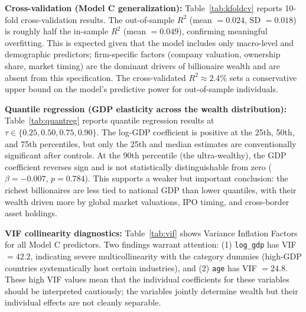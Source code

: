 \documentclass[a4paper,10pt]{article}
\begin{document}
\bigskip

\textbf{Cross-validation (Model C generalization):} Table~\ref{tab:kfoldcv} reports 10-fold cross-validation results. The out-of-sample $R^2$ (mean $=0.024$, SD $=0.018$) is roughly half the in-sample $R^2$ (mean $=0.049$), confirming meaningful overfitting. This is expected given that the model includes only macro-level and demographic predictors; firm-specific factors (company valuation, ownership share, market timing) are the dominant drivers of billionaire wealth and are absent from this specification. The cross-validated $R^2 \approx 2.4\%$ sets a conservative upper bound on the model's predictive power for out-of-sample individuals.

\begin{table}[H]
\centering
\caption{10-fold cross-validation: Model C. $R^2$ computed on held-out folds versus the full-sample in-sample $R^2$. The IS--OOS gap (0.025) indicates overfitting to sample-specific factors.}
\label{tab:kfoldcv}
\small

\end{table}

\textbf{Quantile regression (GDP elasticity across the wealth distribution):} Table~\ref{tab:quantreg} reports quantile regression results at $\tau \in \{0.25, 0.50, 0.75, 0.90\}$. The log-GDP coefficient is positive at the 25th, 50th, and 75th percentiles, but only the 25th and median estimates are conventionally significant after controls. At the 90th percentile (the ultra-wealthy), the GDP coefficient reverses sign and is not statistically distinguishable from zero ($\beta = -0.007$, $p = 0.784$). This supports a weaker but important conclusion: the richest billionaires are less tied to national GDP than lower quantiles, with their wealth driven more by global market valuations, IPO timing, and cross-border asset holdings.

\begin{table}[H]
\centering
\caption{Quantile regression: log-GDP elasticity at different points of the wealth distribution. At $\tau=0.90$, the GDP effect becomes statistically indistinguishable from zero, suggesting weaker national-GDP dependence among the ultra-wealthy.}
\label{tab:quantreg}
\small

\end{table}

\textbf{VIF collinearity diagnostics:} Table~\ref{tab:vif} shows Variance Inflation Factors \cite{wooldridge2010} for all Model C predictors. Two findings warrant attention: (1) \texttt{log\_gdp} has VIF $=42.2$, indicating severe multicollinearity with the category dummies (high-GDP countries systematically host certain industries), and (2) \texttt{age} has VIF $=24.8$. These high VIF values mean that the individual coefficients for these variables should be interpreted cautiously; the variables jointly determine wealth but their individual effects are not cleanly separable.
\end{document}
